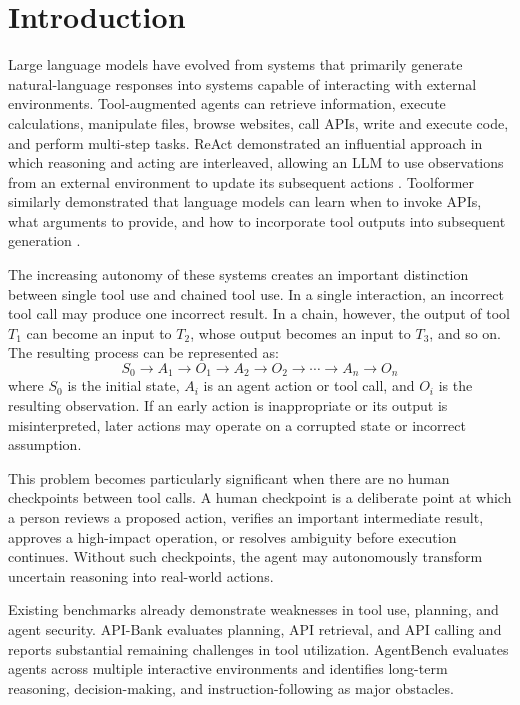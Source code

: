 \documentclass[11pt]{article}
\begin{document}
\section{Introduction}

Large language models have evolved from systems that primarily generate
natural-language responses into systems capable of interacting with external
environments. Tool-augmented agents can retrieve information, execute calculations,
manipulate files, browse websites, call APIs, write and execute code, and perform
multi-step tasks. ReAct demonstrated an influential approach in which reasoning and
acting are interleaved, allowing an LLM to use observations from an external
environment to update its subsequent actions \cite{yao2023react}. Toolformer similarly
demonstrated that language models can learn when to invoke APIs, what arguments
to provide, and how to incorporate tool outputs into subsequent generation \cite{schick2023toolformer}.

The increasing autonomy of these systems creates an important distinction between
single tool use and chained tool use. In a single interaction, an incorrect tool call
may produce one incorrect result. In a chain, however, the output of tool $T_1$ can
become an input to $T_2$, whose output becomes an input to $T_3$, and so on. The
resulting process can be represented as:
\begin{equation}
S_0 \rightarrow A_1 \rightarrow O_1 \rightarrow A_2 \rightarrow O_2
\rightarrow \cdots \rightarrow A_n \rightarrow O_n
\label{eq:chain}
\end{equation}
where $S_0$ is the initial state, $A_i$ is an agent action or tool call, and $O_i$ is
the resulting observation. If an early action is inappropriate or its output is
misinterpreted, later actions may operate on a corrupted state or incorrect
assumption.

This problem becomes particularly significant when there are no human
checkpoints between tool calls. A human checkpoint is a deliberate point at which a
person reviews a proposed action, verifies an important intermediate result, approves
a high-impact operation, or resolves ambiguity before execution continues. Without
such checkpoints, the agent may autonomously transform uncertain reasoning into
real-world actions.

Existing benchmarks already demonstrate weaknesses in tool use, planning,
and agent security. API-Bank evaluates planning, API retrieval, and API calling and reports substantial remaining
challenges in tool utilization. AgentBench evaluates agents across multiple interactive
environments and identifies long-term reasoning, decision-making, and instruction-following
as major obstacles.
\end{document}

